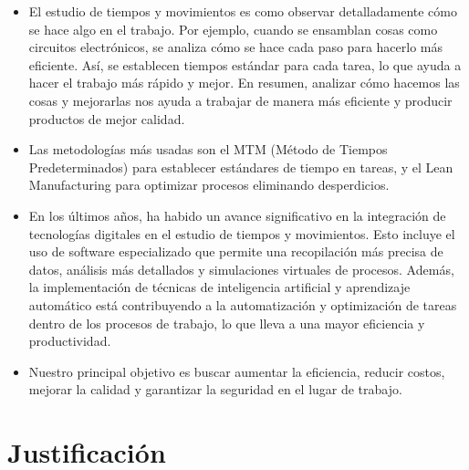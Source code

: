     \begin{itemize}
        \item El estudio de tiempos y movimientos es como observar detalladamente cómo se hace algo en el trabajo. Por ejemplo, cuando se ensamblan cosas como circuitos electrónicos, se analiza cómo se hace cada paso para hacerlo más eficiente. Así, se establecen tiempos estándar para cada tarea, lo que ayuda a hacer el trabajo más rápido y mejor. En resumen, analizar cómo hacemos las cosas y mejorarlas nos ayuda a trabajar de manera más eficiente y producir productos de mejor calidad.
        \cite{estudio}
        \item Las metodologías más usadas son el MTM (Método de Tiempos Predeterminados) para establecer estándares de tiempo en tareas, y el Lean Manufacturing para optimizar procesos eliminando desperdicios.
        \cite{metodología}
        \item En los últimos años, ha habido un avance significativo en la integración de tecnologías digitales en el estudio de tiempos y movimientos. Esto incluye el uso de software especializado que permite una recopilación más precisa de datos, análisis más detallados y simulaciones virtuales de procesos. Además, la implementación de técnicas de inteligencia artificial y aprendizaje automático está contribuyendo a la automatización y optimización de tareas dentro de los procesos de trabajo, lo que lleva a una mayor eficiencia y productividad.
        \item  Nuestro principal objetivo es buscar aumentar la eficiencia, reducir costos, mejorar la calidad y garantizar la seguridad en el lugar de trabajo. 
    \end{itemize}
    \section{Justificación}
    
